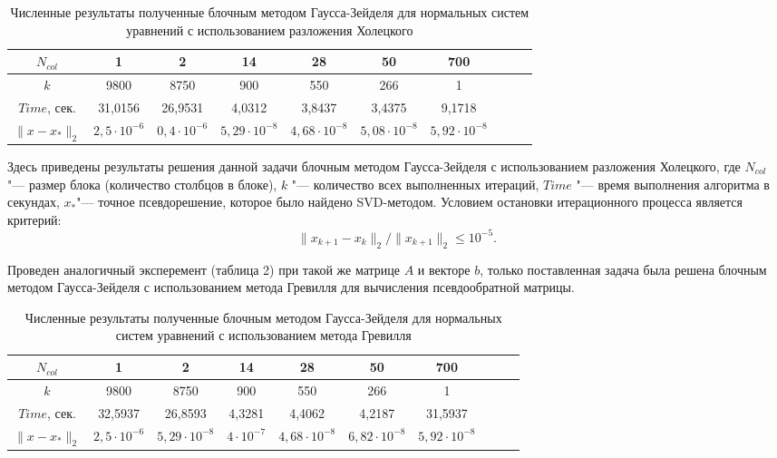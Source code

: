 \begin{table}[htbp]
\caption{Численные результаты полученные блочным методом Гаусса-Зейделя для нормальных систем уравнений с использованием разложения Холецкого}\vspace*{2mm}
\centering \small\label{tabl_3}

\begin{tabular}{c|c|c|c|c|c|c|c|c|c}
\hline
$N_{col}$ & 1 & 2 & 14 & 28 & 50 & 700\\
\hline
$k$ & 9800 & 8750 & 900 & 550 & 266 & 1\\
\hline
$Time$, сек. & 31,0156 & 26,9531 & 4,0312 & 3,8437 & 3,4375 & 9,1718\\
\hline
$\|x-x_{*}\|_{2}$ & $2,5\cdot10^{-6}$ & $0,4\cdot10^{-6}$ & $5,29\cdot10^{-8}$ & $4,68\cdot10^{-8}$ & $5,08\cdot10^{-8}$ & $5,92\cdot10^{-8}$\\
\end{tabular}
\end{table}
Здесь приведены результаты решения данной задачи блочным методом Гаусса-Зейделя с использованием разложения Холецкого, где $N_{col}$
"--- размер блока (количество столбцов в блоке), $k$
"--- количество всех выполненных итераций, $Time$
"--- время выполнения алгоритма в секундах,
$x_{\ast}$"--- точное псевдорешение, которое было найдено SVD-методом.
Условием остановки итерационного процесса является критерий:
\begin{equation}
\|x_{k+1}-x_{k}\|_{2}/\|x_{k+1}\|_{2}\leq 10^{-5}. \nonumber
\end{equation}

Проведен аналогичный эксперемент (таблица 2) при такой же матрице $A$ и векторе $b$, только поставленная задача была решена блочным методом Гаусса-Зейделя с использованием метода Гревилля для вычисления псевдообратной матрицы.
\newpage
\begin{table}[htbp]
\caption{Численные результаты полученные блочным методом Гаусса-Зейделя для нормальных систем уравнений с использованием метода Гревилля}\vspace*{2mm}

\centering \small\label{tabl_4}
\begin{tabular}{c|c|c|c|c|c|c|c|c|c}
\hline
$N_{col}$ & 1 & 2 & 14 & 28 & 50 & 700\\
\hline
$k$ & 9800 & 8750 & 900 & 550 & 266 & 1\\
\hline
$Time$, сек. & 32,5937 & 26,8593 & 4,3281 & 4,4062 & 4,2187 & 31,5937\\
\hline
$\|x-x_{*}\|_{2}$ & $2,5\cdot10^{-6}$ & $5,29\cdot10^{-8}$ & $4\cdot10^{-7}$ & $4,68\cdot10^{-8}$ & $6,82\cdot10^{-8}$ & $5,92\cdot10^{-8}$\\
\end{tabular}
\end{table}

